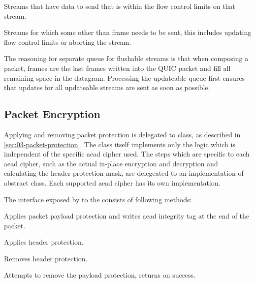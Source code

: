 \begin{itemize}

   Streams that have data to send that is within the flow control limits on that stream.

   Streams for which some other than \STREAM{} frame needs to be sent, this includes updating flow control limits or aborting the stream.

\end{itemize}

The reasoning for separate queue for flushable streams is that when composing a packet, \STREAM{}
frames are the last frames written into the QUIC packet and fill all remaining space in the
datagram. Processing the updateable queue first ensures that updates for all updateable streams are
sent as soon as possible.

\subsection{Packet Encryption}

Applying and removing packet protection is delegated to \CryptoSeal{} class, as described in
\autoref{sec:03-packet-protection}. The \CryptoSeal{} class itself implements only the logic which
is independent of the specific \gls{aead} cipher used. The steps which are specific to each
\gls{aead} cipher, such as the actual in-place encryption and decryption and calculating the header
protection mask, are delegeated to an implementation of \CryptoSealAlgorithm{} abstract class. Each
supported \gls{aead} cipher has its own \CryptoSealAlgorithm{} implementation.

The interface exposed by \CryptoSeal{} to the \ManagedQuicConnection{} consists of following
methods:

\begin{description}

        Applies packet payload protection and writes \gls{aead} integrity tag at the end of the packet.

        Applies header protection.

        Removes header protection.

        Attempts to remove the payload protection, returns  on success.

\end{description}

